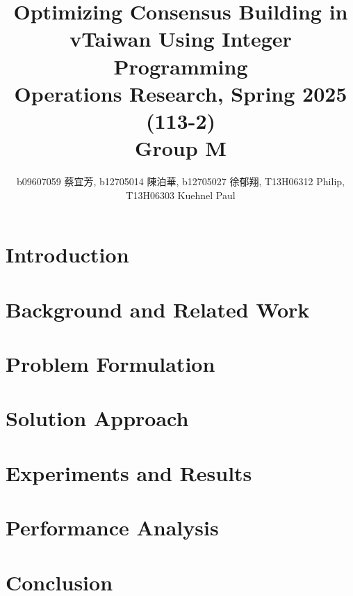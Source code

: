 \documentclass[10pt]{article}
\title{Optimizing Consensus Building in vTaiwan Using Integer Programming \\
\large Operations Research, Spring 2025 (113-2) \\ Group M}
\author{b09607059 蔡宜芳, b12705014 陳泊華,
    b12705027 徐郁翔, T13H06312 Philip, T13H06303 Kuehnel Paul}
\affil{Department of Information Management, National Taiwan University}
\begin{document}
\maketitle


\section{Introduction}\label{sec:intro}


\section{Background and Related Work}\label{sec:background}


\section{Problem Formulation}\label{sec:problem_formulation}


%

\section{Solution Approach}\label{sec:solution}


\section{Experiments and Results}\label{sec:experiments}


\section{Performance Analysis}\label{sec:performance}


\section{Conclusion}\label{sec:conclusion}


\printbibliography
\end{document}
